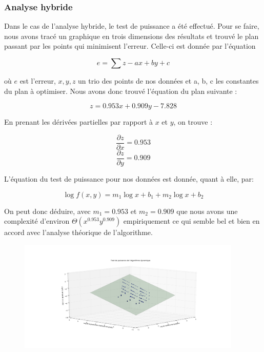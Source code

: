 \documentclass[a4paper, 12pt]{article} %
\begin{document}
\subsubsection*{Analyse hybride}
    Dans le cas de l'analyse hybride, le test de puissance a été effectué. Pour se faire,
    nous avons tracé un graphique en trois dimensions des résultats et trouvé le plan
    passant par les points qui minimisent l'erreur. Celle-ci est donnée par l'équation

    \begin{equation}
        e = \sum z - ax + by + c
    \end{equation}
    
    où $e$ est l'erreur, $x, y, z$ un trio des points de nos données et a, b, c les constantes du plan
    à optimiser. Nous avons donc trouvé l'équation du plan suivante :

    \begin{equation}
        z = 0.953x + 0.909y - 7.828
    \end{equation}

    En prenant les dérivées partielles par rapport à $x$ et $y$, on trouve : 

    \begin{equation}
        \frac{\partial z}{\partial x} = 0.953
    \end{equation}
    \begin{equation}
        \frac{\partial z}{\partial y} = 0.909
    \end{equation}

    L'équation du test de puissance pour nos données est donnée, quant à elle, par:

    \begin{equation}
        \log f(x,y) = m_{1}\log x + b_{1} + m_{2}\log x + b_{2}
    \end{equation}

    On peut donc déduire, avec $m_{1} = 0.953$ et $m_{2} = 0.909$ que nous avons une complexité
    d'environ $\Theta(x^{0.953}y^{0.909})$ empiriquement ce qui semble bel et bien en accord 
    avec l'analyse théorique de l'algorithme.

    \begin{figure}
    	\centering
        \includegraphics[width=0.95\textwidth]{Figure/AlgorithmeDynamique.png}
    \end{figure}
\end{document}
